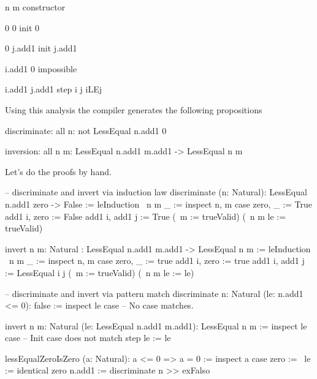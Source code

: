 \begin{alba}
        n               m                   constructor

        0               0                   init 0

        0               j.add1              init j.add1

        i.add1          0                   impossible

        i.add1          j.add1              step i j iLEj
\end{alba}
%
Using this analysis the compiler generates the following propositions
\begin{alba}
    discriminate: all n: not LessEqual n.add1 0

    inversion: all n m: LessEqual n.add1 m.add1 -> LessEqual n m
\end{alba}

Let's do the proofs by hand.

\begin{alba}
    -- discriminate and invert via induction law
    discriminate (n: Natural): LessEqual n.add1 zero -> False :=
        leInduction
            {\ {n m} _ :=
                inspect n, m case
                    zero, _ :=
                        True
                    add1 i, zero :=
                        False
                    add1 i, add1 j :=
                        True}
            (\ {m} := trueValid)
            (\ {n m} le := trueValid)


    invert {n m: Natural}
        : LessEqual n.add1 m.add1 -> LessEqual n m
    :=
        leInduction
            {\ {n m} _ :=
                inspect n, m case
                    zero, _ :=
                        true
                    add1 i, zero :=
                        true
                    add1 i, add1 j :=
                        LessEqual i j}
            (\ {m} := trueValid)
            (\ {n m} le := le)


    -- discriminate and invert via pattern match
    discriminate {n: Natural} (le: n.add1 <= 0): false :=
        inspect le case
            -- No case matches.

    invert {n m: Natural} (le: LessEqual n.add1 m.add1): LessEqual n m
    :=
        inspect le case
            -- Init case does not match
            step le := le
\end{alba}



\begin{alba}
    lessEqualZeroIsZero (a: Natural): a <= 0 => a = 0 :=
        inspect a case
            zero :=
                \ le := identical zero
            n.add1 :=
                discriminate {n} >> exFalso
\end{alba}





